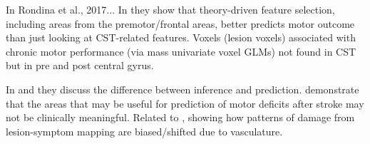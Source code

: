 \documentclass[10pt]{article}
\begin{document}
In Rondina et al., 2017...
In \cite{Rondina2016-ds} they show that theory-driven feature selection, including areas from the premotor/frontal areas, better predicts motor outcome than just looking at CST-related features. Voxels (lesion voxels) associated with chronic motor performance (via mass univariate voxel GLMs) not found in CST but in pre and post central gyrus.

In \cite{Sperber2021-lw} and \cite{Bzdok2020-py} they discuss the difference between inference and prediction.  \cite{Sperber2021-lw} demonstrate that the areas that may be useful for prediction of motor deficits after stroke may not be clinically meaningful. Related to \cite{Mah2014-cb}, showing how patterns of damage from lesion-symptom mapping are biased/shifted due to vasculature.
\end{document}
